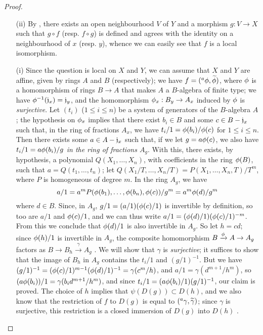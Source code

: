 \begin{proof}
\label{proof-1.6.5.4}
\medskip\noindent
\begin{enumerate}
    \item[(ii)] By , there exists an open neighbourhood $V$ of $Y$ and a morphism $g:V\to X$ such that $g\circ f$ (resp. $f\circ g$) is defined and agrees with the identity on a neighbourhood of $x$ (resp. $y$), whence we can easily see that $f$ is a local isomorphism.
    \item[(i)] Since the question is local on $X$ and $Y$, we can assume that $X$ and $Y$ are affine, given by rings $A$ and $B$ (respectively);
    we have $f=({}^a\phi,{\widetilde{\phi}})$, where $\phi$ is a homomorphism of rings $B\to A$ that makes $A$ a $B$-algebra of finite type;
    we have $\phi^{-1}(\mathfrak{j}_x)=\mathfrak{j}_y$, and the homomorphism $\vphi_x:B_y\to A_x$ induced by $\phi$ is \emph{surjective}.
    Let $(t_i)$ ($1\leq i\leq n$) be a system of generators of the $B$-algebra $A$;
    the hypothesis on $\phi_x$ implies that there exist $b_i\in B$ and some $c\in B-\mathfrak{j}_x$ such that, in the ring of fractions $A_x$, we have $t_i/1=\phi(b_i)/\phi(c)$ for $1\leq i\leq n$.
    Then  there exists some $a\in A-\mathfrak{j}_x$ such that, if we let $g=a\phi(c)$, we also have $t_i/1=a\phi(b_i)/g$ \emph{in the ring of fractions $A_g$}.
    With this, there exists, by hypothesis, a polynomial $Q(X_1,\ldots,X_n)$, with coefficients in the ring $\phi(B)$, such that $a=Q(t_1,\ldots,t_n)$;
    let $Q(X_1/T,\ldots,X_n/T)=P(X_1,\ldots,X_n,T)/T^m$, where $P$ is homogeneous of degree $m$.
    In the ring $A_g$, we have
    \[
      a/1=a^mP(\phi(b_1),\ldots,\phi(b_n),\phi(c))/g^m=a^m\phi(d)/g^m
    \]
    where $d\in B$.
    Since, in $A_g$, $g/1=(a/1)(\phi(c)/1)$ is invertible by definition, so too are $a/1$ and $\phi(c)/1$, and we can thus write $a/1=(\phi(d)/1)(\phi(c)/1)^{-m}$.
    From this we conclude that $\phi(d)/1$ is also invertible in $A_g$.
    So let $h=cd$;
    since $\phi(h)/1$ is invertible in $A_g$, the composite homomorphism $B\xrightarrow{\vphi}A\to A_g$ factors as $B\to B_h\xrightarrow{\gamma}A_g$ .
    We will show that $\gamma$ is \emph{surjective};
    it suffices to show that the image of $B_h$ in $A_g$ contains the $t_i/1$ and $(g/1)^{-1}$.
    But we have $(g/1)^{-1}=(\phi(c)/1)^{m-1}(\phi(d)/1)^{-1}=\gamma(c^m/h)$, and $a/1=\gamma(d^{m+1}/h^m)$, so $(a\phi(b_i))/1=\gamma(b_id^{m+1}/h^m)$, and since $t_i/1=(a\phi(b_i)/1)(g/1)^{-1}$, our claim is proved.
    The choice of $h$ implies that $\psi(D(g))\subset D(h)$, and we also know that the restriction of $f$ to $D(g)$ is equal to $({}^a\gamma,{\widetilde{\gamma}})$;
    since $\gamma$ is surjective, this restriction is a closed immersion of $D(g)$ into $D(h)$ .
\end{enumerate}
\end{proof}

